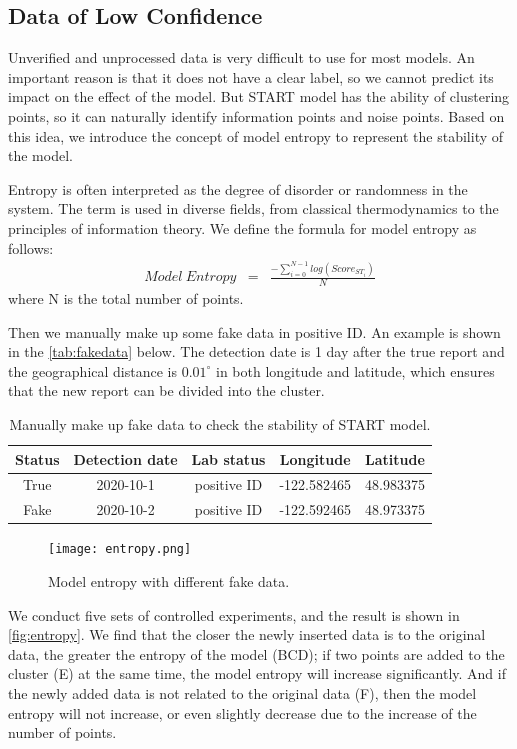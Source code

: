 \documentclass{mcmthesis}
\begin{document}
\subsection{Data of Low Confidence}
Unverified and unprocessed data is very difficult to use for most models. An important reason is that it does not have a clear label, so we cannot predict its impact on the effect of the model. But START model has the ability of clustering points, so it can naturally identify information points and noise points. Based on this idea, we introduce the concept of model entropy to represent the stability of the model.

Entropy is often interpreted as the degree of disorder or randomness in the system. The term is used in diverse fields, from classical thermodynamics to the principles of information theory. We define the formula for model entropy as follows:
\begin{eqnarray}
Model\ Entropy & = & \frac{-\sum_{i =  0}^{N-1}  log(Score_{ST_i})}{N}
\end{eqnarray}
where N is the total number of points.

Then we manually make up some fake data in positive ID. An example is shown in the \autoref{tab:fakedata} below. The detection date is 1 day after the true report and the geographical distance is $ 0.01^\circ$ in both longitude and latitude, which ensures that the new report can be divided into the cluster.

\begin{table}[H]
    \centering
    \begin{tabular}{ccccc} 
        \toprule
        Status & Detection date & Lab status  & Longitude   & Latitude    \\ 
        \midrule
        True   & 2020-10-1      & positive ID & -122.582465 & 48.983375  \\ 
        Fake   & 2020-10-2      & positive ID & -122.592465 & 48.973375  \\
        \bottomrule
    \end{tabular}
    \caption{Manually make up fake data to check the stability of START model.}
    \label{tab:fakedata}
\end{table}

\begin{figure}[h]
    \centering
    \texttt{[image: entropy.png]}
    \caption{Model entropy with different fake data.}
    \label{fig:entropy}
\end{figure}
We conduct five sets of controlled experiments, and the result is shown in \autoref{fig:entropy}. We find that the closer the newly inserted data is to the original data, the greater the entropy of the model (BCD); if two points are added to the cluster (E) at the same time, the model entropy will increase significantly. And if the newly added data is not related to the original data (F), then the model entropy will not increase, or even slightly decrease due to the increase of the number of points.
\end{document}
